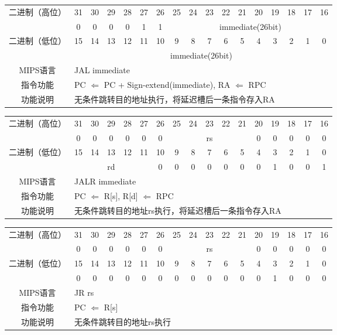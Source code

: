 \begin{table}
\begin{tabular}{|c|c|c|c|c|c|c|c|c|c|c|c|c|c|c|c|c|}
\hline
\multirow{2}{*}{二进制（高位）} &
31&30&29&28&27&26&25&24&23&22&21&20&19&18&17&16\\
\cline{2-17}
&
0&0&0&0&1&
1&
\multicolumn{10}{c|}{immediate(26bit)}\\
\hline
\multirow{2}{*}{二进制（低位）} &
15&14&13&12&11&10&9&8&7&6&5&4&3&2&1&0\\
\cline{2-17}
&
\multicolumn{16}{c|}{immediate(26bit)}\\
\hline
MIPS语言&
\multicolumn{16}{l|}{JAL immediate}\\
\hline
指令功能&
\multicolumn{16}{l|}{PC $\Leftarrow$ PC + Sign-extend(immediate), RA $\Leftarrow$ RPC}\\
\hline
功能说明&
\multicolumn{16}{l|}{无条件跳转目的地址执行，将延迟槽后一条指令存入RA}\\
\hline
\end{tabular}
\end{table}

\begin{table}
\begin{tabular}{|c|c|c|c|c|c|c|c|c|c|c|c|c|c|c|c|c|}
\hline
\multirow{2}{*}{二进制（高位）} &
31&30&29&28&27&26&25&24&23&22&21&20&19&18&17&16\\
\cline{2-17}
&
0&0&0&0&0&
0&
\multicolumn{5}{c|}{rs}&
0&0&0&0&0\\
\hline
\multirow{2}{*}{二进制（低位）} &
15&14&13&12&11&10&9&8&7&6&5&4&3&2&1&0\\
\cline{2-17}
&
\multicolumn{5}{c|}{rd}&
0&0&0&0&0&
0&0&1&0&0&
1\\
\hline
MIPS语言&
\multicolumn{16}{l|}{JALR immediate}\\
\hline
指令功能&
\multicolumn{16}{l|}{PC $\Leftarrow$ R[s], R[d] $\Leftarrow$ RPC}\\
\hline
功能说明&
\multicolumn{16}{l|}{无条件跳转目的地址rs执行，将延迟槽后一条指令存入RA}\\
\hline
\end{tabular}
\end{table}

\begin{table}
\begin{tabular}{|c|c|c|c|c|c|c|c|c|c|c|c|c|c|c|c|c|}
\hline
\multirow{2}{*}{二进制（高位）} &
31&30&29&28&27&26&25&24&23&22&21&20&19&18&17&16\\
\cline{2-17}
&
0&0&0&0&0&
0&
\multicolumn{5}{c|}{rs}&
0&0&0&0&0\\
\hline
\multirow{2}{*}{二进制（低位）} &
15&14&13&12&11&10&9&8&7&6&5&4&3&2&1&0\\
\cline{2-17}
&
0&0&0&0&0&
0&0&0&0&0&
0&0&1&0&0&
0\\
\hline
MIPS语言&
\multicolumn{16}{l|}{JR rs}\\
\hline
指令功能&
\multicolumn{16}{l|}{PC $\Leftarrow$ R[s]}\\
\hline
功能说明&
\multicolumn{16}{l|}{无条件跳转目的地址rs执行}\\
\hline
\end{tabular}
\end{table}

